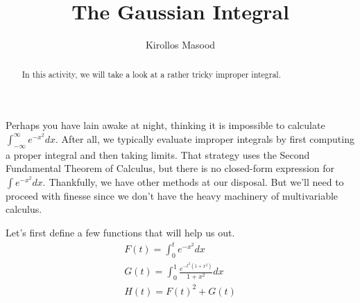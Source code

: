 \documentclass{ximera}
\title{The Gaussian Integral}
\author{Kirollos Masood}
\begin{document}
\begin{abstract}
In this activity, we will take a look at a rather tricky improper integral.
\end{abstract}
\maketitle

Perhaps you have lain awake at night, thinking it is impossible to calculate $\int_{-\infty}^{\infty} e^{-x^2}dx$. After all, we typically evaluate improper integrals by first computing a proper integral and then taking limits. That strategy uses the Second Fundamental Theorem of Calculus, but there is no closed-form expression for $\int e^{-x^2} dx$. Thankfully, we have other methods at our disposal. But we'll need to proceed with finesse since we don't have the heavy machinery of multivariable calculus.

Let's first define a few functions that will help us out.
\begin{gather*}
	F(t)=\int_{0}^{t} e^{-x^2}dx \\
	G(t)=\int_{0}^{1} \frac{e^{-t^2(1+x^2)}}{1+x^2} dx \\
	H(t)=F(t)^2+G(t)
\end{gather*}
\end{document}

